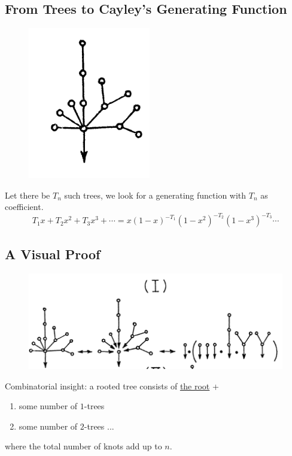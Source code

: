 \documentclass{article}
\theoremstyle{definition}
\theoremstyle{question}
\begin{document}
    \subsection{From Trees to Cayley’s Generating Function}
        \begin{figure}[h]
            \centering
            \includegraphics[scale=0.5]{images/rooted-tree.png}
            \label{fig:rooted-tree}
        \end{figure}
        \noindent Let there be $T_n$ such trees, we look for a generating function with 
        $T_n$ as coefficient.
        \begin{equation*} %
             T_1x + T_2 x^2 + T_3 x^3 +\cdots = x(1-x)^{-T_1}(1-x^2)^{-T_2}(1-x^3)^{-T_3}\cdots
        \end{equation*}

    \subsection{A Visual Proof}
        \begin{figure}[h]
            \centering
            \includegraphics[scale=0.6]{images/tree1.png}
            \label{fig:enter-label}
        \end{figure}
    Combinatorial insight: a rooted tree consists of \underline{the root} +  
    \begin{enumerate}
        \item some number of $1$-trees
        \item some number of $2$-trees ...
    \end{enumerate}
    where the total number of knots add up to $n$.
\end{document}
